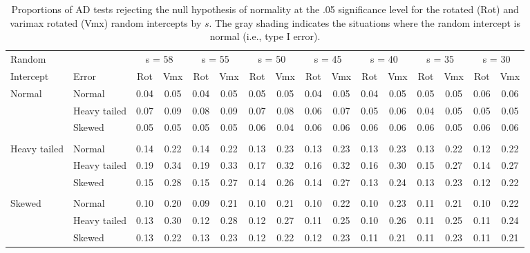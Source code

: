 \documentclass[12pt]{article} %
\begin{document}
\begin{table}
\centering
\caption{Proportions of AD tests rejecting the null hypothesis of normality at the .05 significance level for the rotated (Rot) and varimax rotated (Vmx) random intercepts by $s$. The gray shading indicates the situations where the random intercept is normal (i.e., type I error).}
\begin{footnotesize}
\begin{tabular}{ll cccccccccccccc}\hline
Random & & \multicolumn{2}{c}{s = 58} & \multicolumn{2}{c}{s = 55} & \multicolumn{2}{c}{s = 50} & \multicolumn{2}{c}{s = 45} & \multicolumn{2}{c}{s = 40} & \multicolumn{2}{c}{s = 35} & \multicolumn{2}{c}{s = 30} \\
Intercept	&	Error	&	Rot	&	Vmx	&	Rot	&	Vmx	&	Rot	&	Vmx	&	Rot	&	Vmx	&	Rot	&	Vmx	&	Rot	&	Vmx	&	Rot	&	Vmx	\\ \hline
\rowcolor{gray!20}Normal	&	Normal			&	0.04	&	0.05	&	0.04	&	0.05	&	0.05	&	0.05	&	0.04	&	0.05	&	0.04	&	0.05	&	0.05	&	0.05	&	0.06	&	0.06	\\
\rowcolor{gray!20}	    &	Heavy tailed		&	0.07	&	0.09	&	0.08	&	0.09	&	0.07	&	0.08	&	0.06	&	0.07	&	0.05	&	0.06	&	0.04	&	0.05	&	0.05	&	0.05	\\
\rowcolor{gray!20}	    &	Skewed			&	0.05	&	0.05	&	0.05	&	0.05	&	0.06	&	0.04	&	0.06	&	0.06	&	0.06	&	0.06	&	0.06	&	0.05	&	0.06	&	0.06	\\
	&		&		&		&		&		&		&		&		&		&		&		&		&		&		&		\\
Heavy tailed	&	Normal		&	0.14	&	0.22	&	0.14	&	0.22	&	0.13	&	0.23	&	0.13	&	0.23	&	0.13	&	0.23	&	0.13	&	0.22	&	0.12	&	0.22	\\
	        &	Heavy tailed	&	0.19	&	0.34	&	0.19	&	0.33	&	0.17	&	0.32	&	0.16	&	0.32	&	0.16	&	0.30	&	0.15	&	0.27	&	0.14	&	0.27	\\
			&	Skewed		&	0.15	&	0.28	&	0.15	&	0.27	&	0.14	&	0.26	&	0.14	&	0.27	&	0.13	&	0.24	&	0.13	&	0.23	&	0.12	&	0.22	\\
			&		&		&		&		&		&		&		&		&		&		&		&		&		&		&		\\
Skewed	&	Normal			&	0.10	&	0.20	&	0.09	&	0.21	&	0.10	&	0.21	&	0.10	&	0.22	&	0.10	&	0.23	&	0.11	&	0.21	&	0.10	&	0.22	\\
		&	Heavy tailed		&	0.13	&	0.30	&	0.12	&	0.28	&	0.12	&	0.27	&	0.11	&	0.25	&	0.10	&	0.26	&	0.11	&	0.25	&	0.11	&	0.24	\\
		&	Skewed			&	0.13	&	0.22	&	0.13	&	0.23	&	0.12	&	0.22	&	0.12	&	0.23	&	0.11	&	0.21	&	0.11	&	0.23	&	0.11	&	0.21	\\
\hline
\end{tabular}
\end{footnotesize}
\end{table}
\end{document}
